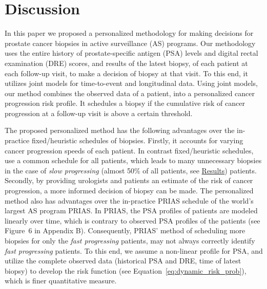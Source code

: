 
\section{Discussion}
\label{sec:discussion}
In this paper we proposed a personalized methodology for making decisions for prostate cancer biopsies in active surveillance (AS) programs. Our methodology uses the entire history of prostate-specific antigen (PSA) levels and digital rectal examination (DRE) scores, and results of the latest biopsy, of each patient at each follow-up visit, to make a decision of biopsy at that visit. To this end, it utilizes joint models for time-to-event and longitudinal data. Using joint models, our method combines the observed data of a patient, into a personalized cancer progression risk profile. It schedules a biopsy if the cumulative risk of cancer progression at a follow-up visit is above a certain threshold.

The proposed personalized method has the following advantages over the in-practice fixed/heuristic schedules \citep{loeb2014heterogeneity,inoue2018comparative} of biopsies. Firstly, it accounts for varying cancer progression speeds of each patient. In contrast fixed/heuristic schedules, use a common schedule for all patients, which leads to many unnecessary biopsies in the case of \textit{slow progressing} (almost 50\% of all patients, see \hyperref[sec:results]{Results}) patients. Secondly, by providing urologists and patients an estimate of the risk of cancer progression, a more informed decision of biopsy can be made. The personalized method also has advantages over the in-practice PRIAS schedule of the world's largest AS program PRIAS. In PRIAS, the PSA profiles of patients are modeled linearly over time, which is contrary to observed PSA profiles of the patients (see Figure~6 in Appendix B). Consequently, PRIAS' method of scheduling more biopsies for only the \textit{fast progressing} patients, may not always correctly identify \textit{fast progressing} patients. To this end, we assume a non-linear profile for PSA, and utilize the complete observed data (historical PSA and DRE, time of latest biopsy) to develop the risk function (see Equation~\ref{eq:dynamic_risk_prob}), which is finer quantitative measure.

